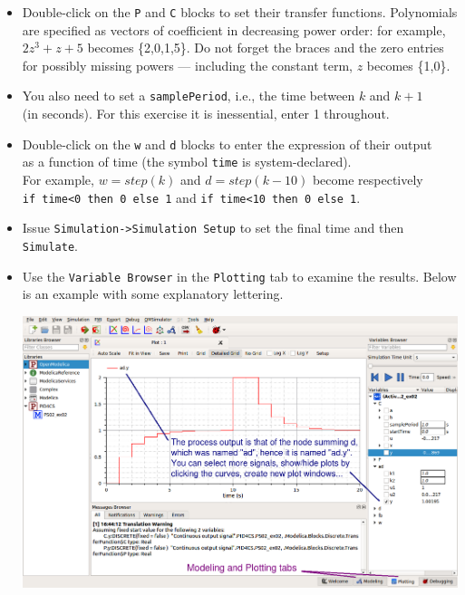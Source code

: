 \begin{frame}
\myPause
 \begin{itemize}[<+-| alert@+>]
 \item Double-click on the \texttt{P} and \texttt{C} blocks to set their transfer functions. Polynomials\\
       are specified as vectors of coefficient in decreasing power order: for example,\\
       $2z^3+z+5$ becomes \{2,0,1,5\}. Do not forget the braces and the zero entries\\
       for possibly missing powers --- including the constant term, $z$ becomes \{1,0\}.
 \item You also need to set a \texttt{samplePeriod}, i.e., the time between $k$ and $k+1$\\
       (in seconds). For this exercise it is inessential, enter 1 throughout.
 \item Double-click on the \texttt{w} and \texttt{d} blocks to enter the expression of their output\\
       as a function of time (the symbol \texttt{time} is system-declared).\\
       For example, $w=step(k)$ and $d=step(k-10)$ become respectively\\
       \texttt{if time<0 then 0 else 1} and \texttt{if time<10 then 0 else 1}.
 \end{itemize}
\end{frame}

\begin{frame}
\myPause
 \begin{itemize}[<+-| alert@+>]
 \item Issue \texttt{Simulation->Simulation Setup} to set the final time and then \texttt{Simulate}.
 \item Use the \texttt{Variable Browser} in the \texttt{Plotting} tab to examine the results. Below\\
       is an example with some explanatory lettering.
       \begin{center}
        \includegraphics[width=0.60\columnwidth]{./Unit-05/img/PS02-ex02-fig03.png}
       \end{center}
 \end{itemize}
\end{frame}

